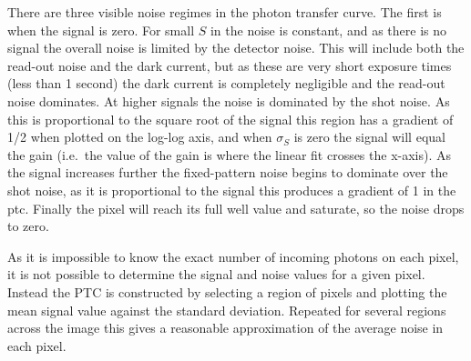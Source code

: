 \begin{colsection}
\begin{colsection}
There are three visible noise regimes in the photon transfer curve. The first is when the signal is zero. For small $S$ in  the noise is constant, and as there is no signal the overall noise is limited by the detector noise. This will include both the read-out noise and the dark current, but as these are very short exposure times (less than 1 second) the dark current is completely negligible and the read-out noise dominates. At higher signals the noise is dominated by the shot noise. As this is proportional to the square root of the signal this region has a gradient of 1/2 when plotted on the log-log axis, and when $\sigma_S$ is zero the signal will equal the gain (i.e.\ the value of the gain is where the linear fit crosses the x-axis). As the signal increases further the fixed-pattern noise begins to dominate over the shot noise, as it is proportional to the signal this produces a gradient of 1 in the \gls{ptc}. Finally the pixel will reach its full well value and saturate, so the noise drops to zero.

As it is impossible to know the exact number of incoming photons on each pixel, it is not possible to determine the signal and noise values for a given pixel. Instead the PTC is constructed by selecting a region of pixels and plotting the mean signal value against the standard deviation. Repeated for several regions across the image this gives a reasonable approximation of the average noise in each pixel.

\newpage


\end{colsection}
\end{colsection}
